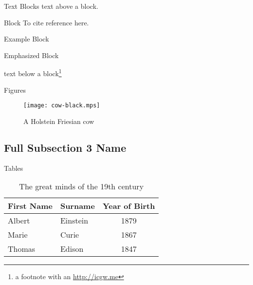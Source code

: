 \documentclass[]{beamer}
\begin{document}
\begin{frame}{Text Blocks}
	text above a block.
	\begin{block}{Block}
		To cite reference\cite{icgw} here.
	\end{block}
	\begin{exampleblock}{Example Block}
	\end{exampleblock}
	\begin{alertblock}{Emphasized Block}
	\end{alertblock}
	text below a block\footnote{a footnote with an \url{http://icgw.me}}
\end{frame}

\begin{frame}{Figures}
	\begin{figure}
		\texttt{[image: cow-black.mps]}
		\caption{A Holstein Friesian cow}
	\end{figure}
\end{frame}

\subsection[Short Subsection 3 Name]{Full Subsection 3 Name}

\begin{frame}{Tables}
	\begin{table}
		\begin{tabular}{llc}
			First Name & Surname  & Year of Birth \\ \midrule
			Albert     & Einstein & 1879          \\
			Marie      & Curie    & 1867          \\
			Thomas     & Edison   & 1847          \\
		\end{tabular}
		\caption{The great minds of the 19th century}
	\end{table}
\end{frame}
\end{document}

